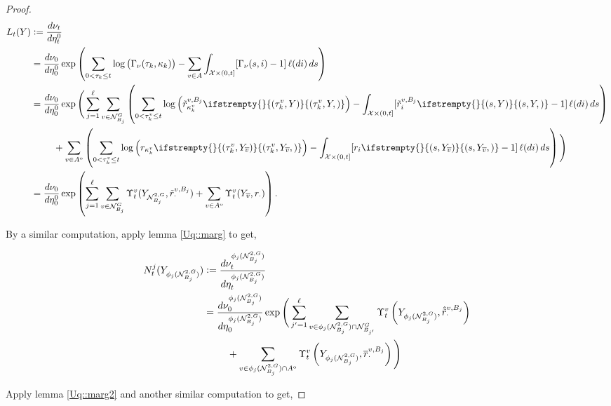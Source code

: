 \documentclass[12pt]{article}
\newcommand{\mc}{\mathcal}
\newcommand{\ov}{\overline}
\newcommand{\defeq}{:=}								%
\newcommand{\sta}{\mc{X}}							%
\newcommand{\gneigh}[2]{\mc{N}^{#1}_{#2}}			%
\newcommand{\dgneigh}[2]{\mc{N}^{2,#1}_{#2}}		%
\newcommand{\cl}[1]{\ov{#1}}						%
\newcommand{\indx}[1]{^{#1}}						%
\newcommand{\Sm}{\ell}								%
\newcommand{\rate}{r}								%
\newcommand{\vind}[1]{_{#1}}						%
\newcommand{\vpara}[1]{^{#1}}						%
\newcommand{\stpara}[1]{_{#1}}						%
\newcommand{\tpara}[1]{_{#1}}						%
\newcommand{\psize}{\ell}							%
\newcommand{\tmepro}[3]{
\ifstrempty{#3}{
	\left(#1,#2\right)}{
	\left(#1,#2,#3\right)}}							%
\newcommand{\Xg}{Y}									%
\newcommand{\brate}{\alt{\rate}}					%
\newcommand{\inte}[1]{{#1}^\mathrm{o}}				%
\newcommand{\alt}[1]{\tilde{#1}}					%
\newcommand{\rt}{\tau}								%
\renewcommand{\mark}{\kappa}						%
\newcommand{\ratee}{\Gamma}							%
\newcommand{\mm}{\nu}								%
\newcommand{\bgrate}{\ov{\rate}}					%
\newcommand{\bcrate}{\hat{\brate}}					%
\newcommand{\mmm}{\eta}								%
\newcommand{\ds}{\Upsilon}							%
\newcommand{\dense}{L}								%
\newcommand{\densen}{N}								%
\newcommand{\prc}[1]{_{#1}}							%
\renewcommand{\it}[1]{_{#1}}						%
\newcommand{\jpara}[1]{^{#1}}						%
\newcommand{\vjpara}[2]{^{#1,#2}}					%
\begin{document}
\begin{proof}
\begin{align*}
\dense\tpara{t}(\Xg)&\defeq \frac{d\mm\tpara{t}}{d\mmm\tpara{t}\indx{0}}\\
&= \frac{d\mm\tpara{0}}{d\mmm\tpara{0}\indx{0}}\exp\left(\sum_{0< \rt\it{k}\leq t} \log\left(\ratee\prc{\mm}(\rt\it{k},\mark\it{k})\right) - \sum_{v \in A}\int_{\sta\times (0,t]} [\ratee\prc{\mm}(s,i) - 1]\,\Sm(di)\,ds\right)\\
&= \frac{d\mm\tpara{0}}{d\mmm\tpara{0}\indx{0}}\exp\Bigg(\sum_{j=1}^\psize \sum_{v \in \gneigh{G}{B_j}}\left(\sum_{0 < \rt\it{k}\vpara{v}\leq t} \log\left(\brate\vjpara{v}{B_j}\stpara{\mark\it{k}\vpara{v}}\tmepro{\rt\it{k}\vpara{v}}{\Xg}{}\right) - \int_{\sta\times (0,t]} [\brate\vjpara{v}{B_j}\stpara{i}\tmepro{s}{\Xg}{} - 1]\,\Sm(di)\,ds\right) \\
&\hspace{24 pt} + \sum_{v \in \inte{A}}\left(\sum_{0 < \rt\it{k}\vpara{v}\leq t} \log\left(\rate\stpara{\mark\it{k}\vpara{v}}\tmepro{\rt\it{k}\vpara{v}}{\Xg\vind{\cl{v}}}{}\right) - \int_{\sta\times (0,t]} [\rate\stpara{i}\tmepro{s}{\Xg\vind{\cl{v}}}{} - 1]\,\Sm(di)\,ds\right)\Bigg)\\
&= \frac{d\mm\tpara{0}}{d\mmm\tpara{0}\indx{0}}\exp\left(\sum_{j=1}^{\psize}\sum_{v\in \gneigh{G}{B_j}} \ds\vpara{v}\tpara{t}(\Xg\vind{\dgneigh{G}{B_j}},\brate\vjpara{v}{B_j}\stpara{\cdot}) + \sum_{v\in\inte{A}}\ds\vpara{v}\tpara{t}(\Xg\vind{\cl{v}},\rate\stpara{\cdot})\right).
\end{align*}

By a similar computation, apply lemma \ref{Uq::marg} to get,

\begin{align*}
\densen\jpara{j}\tpara{t}(\Xg\vind{\phi_j(\dgneigh{G}{B_j})}) &\defeq \frac{d\mm\vpara{\phi_j(\dgneigh{G}{B_j})}\tpara{t}}{d\mmm\vpara{\phi_j(\dgneigh{G}{B_j})}\tpara{t}}\\
&= \frac{d\mm\vpara{\phi_j(\dgneigh{G}{B_j})}\tpara{0}}{d\mmm\vpara{\phi_j(\dgneigh{G}{B_j})}\tpara{0}}\exp\Bigg(\sum_{j'=1}^\psize \sum_{v \in \phi_j(\dgneigh{G}{B_j})\cap \gneigh{G}{B_{j'}}} \ds\vpara{v}\tpara{t}\left(\Xg\vind{\phi_j(\dgneigh{G}{B_j})},\bcrate\vjpara{v}{B_j}\stpara{\cdot}\right)\\
&\hspace{24 pt} + \sum_{v \in \phi_j(\dgneigh{G}{B_j})\cap\inte{A}} \ds\vpara{v}\tpara{t}\left(\Xg\vind{\phi_j(\dgneigh{G}{B_j})},\bgrate\vjpara{v}{B_j}\stpara{\cdot}\right)\Bigg)
\end{align*}

Apply lemma \ref{Uq::marg2} and another similar computation to get,


\end{proof}
\end{document}
